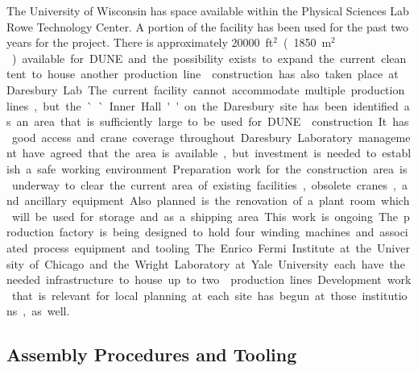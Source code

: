 The University of Wisconsin has space available within the Physical Sciences Lab Rowe Technology Center. A portion of the facility has been used for the past two years for the  project. There is approximately \SI{20000}{ft$^2$} (\SI{1850}{m$^2$}) available for DUNE and the possibility exists to expand the current clean tent to house another production line. 

 construction has also taken place at Daresbury Lab.  The current facility cannot accommodate multiple production lines, but the ``Inner Hall'' on the Daresbury site has been identified as an area that is sufficiently large to be used for DUNE  construction. It has good access and crane coverage throughout. Daresbury Laboratory management have agreed that the area is available, but investment is needed to establish a safe working environment. Preparation work for the construction area is underway to clear the current area of existing facilities, obsolete cranes, and ancillary equipment. Also planned is the renovation of a plant room which will be used for storage and as a shipping area. This work is ongoing. The production factory is being designed to hold four winding machines and associated process equipment and tooling. 

The Enrico Fermi Institute at the University of Chicago and the Wright Laboratory at Yale University each have the needed infrastructure to house up to two  production lines. Development work that is relevant for local planning at each site has begun at those institutions, as well.


\subsection{Assembly Procedures and Tooling}
\label{sec:fdsp-apa-assy}

